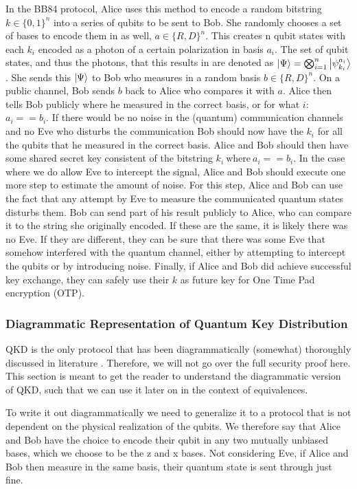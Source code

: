\documentclass[]{article}
\begin{document}
In the BB84 protocol, Alice uses this method to encode a random bitstring $k \in \{0,1\}^n $ into a series of qubits to be sent to Bob. She randomly chooses a set of bases to encode them in as well,  $a \in \{R, D\}^n$. This creates n qubit states with each $k_i$ encoded as a photon of a certain polarization in basis $a_i$. The set of qubit states, and thus the photons, that this results in are denoted as $\ket{\Psi} = \bigotimes_{i=1}^n \ket{\psi_{k_i}^{a_i}} $. She sends this $\ket{\Psi}$ to Bob who measures in a random basis $b \in \{R, D\}^n$. On a public channel, Bob sends $b$ back to Alice who compares it with $a$. Alice then tells Bob publicly where he measured in the correct basis, or for what $i$: $a_i == b_i$. If there would be no noise in the (quantum) communication channels and no Eve who disturbs the communication Bob should now have the $k_i$ for all the qubits that he measured in the correct basis. Alice and Bob should then have some shared secret key consistent of the bitstring $k_i ~\text{where} ~a_i == b_i$. In the case where we do allow Eve to intercept the signal, Alice and Bob should execute one more step to estimate the amount of noise. For this step, Alice and Bob can use the fact that any attempt by Eve to measure the communicated quantum states disturbs them. Bob can send part of his result publicly to Alice, who can compare it to the string she originally encoded. If these are the same, it is likely there was no Eve. If they are different, they can be sure that there was some Eve that somehow interfered with the quantum channel, either by attempting to intercept the qubits or by introducing noise. Finally, if Alice and Bob did achieve successful key exchange, they can safely use their $k$ as future key for One Time Pad encryption (OTP).

\subsubsection{Diagrammatic Representation of Quantum Key Distribution}
QKD is the only protocol that has been diagrammatically (somewhat) thoroughly discussed in literature \cite{Kissinger2017}. Therefore, we will not go over the full security proof here. This section is meant to get the reader to understand the diagrammatic version of QKD, such that we can use it later on in the context of equivalences.

To write it out diagrammatically we need to generalize it to a protocol that is not dependent on the physical realization of the qubits. We therefore say that Alice and Bob have the choice to encode their qubit in any two mutually unbiased bases, which we choose to be the z and x bases. Not considering Eve, if Alice and Bob then measure in the same basis, their quantum state is sent through just fine.
\end{document}
